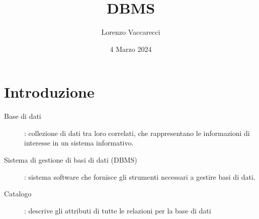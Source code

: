 \documentclass[12pt]{article}
\title{DBMS}
\author{Lorenzo Vaccarecci}
\date{4 Marzo 2024}
\begin{document}
\maketitle
\section{Introduzione}
\begin{description}
    \item[Base di dati]: collezione di dati tra loro correlati, che rappresentano le informazioni di interesse in un sistema informativo.
    \item[Sistema di gestione di basi di dati (DBMS)]: sistema software che fornisce gli strumenti necessari a gestire basi di dati. 
    \item[Catalogo]: descrive gli attributi di tutte le relazioni per la base di dati 
\end{description}
\end{document}
